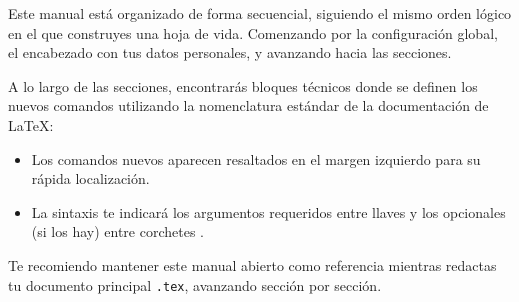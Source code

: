 Este manual está organizado de forma secuencial, siguiendo el mismo orden lógico en el que construyes una hoja de vida.
Comenzando por la configuración global, el encabezado con tus datos personales, y avanzando hacia las secciones.

A lo largo de las secciones, encontrarás bloques técnicos donde se definen los nuevos comandos utilizando la nomenclatura estándar de la documentación de {\lmr\LaTeX}:
\begin{itemize}
    \item Los comandos nuevos aparecen resaltados en el margen izquierdo para su rápida localización.
    \item La sintaxis te indicará los argumentos requeridos entre llaves  y los opcionales (si los hay) entre corchetes .
\end{itemize}

Te recomiendo mantener este manual abierto como referencia mientras redactas tu documento principal \texttt{.tex}, avanzando sección por sección.
